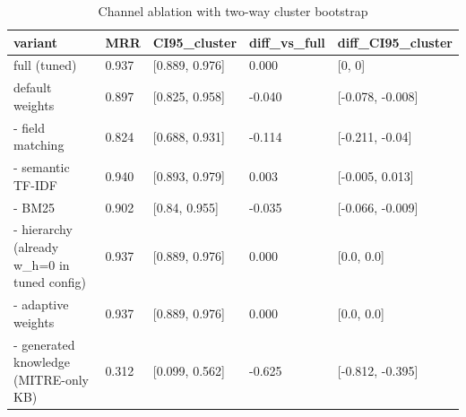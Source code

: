 \begin{table}[t]\centering\caption{Channel ablation with two-way cluster bootstrap}
\begin{tabular}{lllll}\hline
variant & MRR & CI95\_cluster & diff\_vs\_full & diff\_CI95\_cluster \\\hline
full (tuned) & 0.937 & [0.889, 0.976] & 0.000 & [0, 0] \\
default weights & 0.897 & [0.825, 0.958] & -0.040 & [-0.078, -0.008] \\
- field matching & 0.824 & [0.688, 0.931] & -0.114 & [-0.211, -0.04] \\
- semantic TF-IDF & 0.940 & [0.893, 0.979] & 0.003 & [-0.005, 0.013] \\
- BM25 & 0.902 & [0.84, 0.955] & -0.035 & [-0.066, -0.009] \\
- hierarchy (already w\_h=0 in tuned config) & 0.937 & [0.889, 0.976] & 0.000 & [0.0, 0.0] \\
- adaptive weights & 0.937 & [0.889, 0.976] & 0.000 & [0.0, 0.0] \\
- generated knowledge (MITRE-only KB) & 0.312 & [0.099, 0.562] & -0.625 & [-0.812, -0.395] \\
\hline\end{tabular}\end{table}

